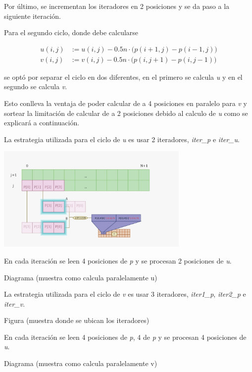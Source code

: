 Por último, se incrementan los iteradores en 2 posiciones y se da paso a la
siguiente iteración.

Para el segundo ciclo, donde debe calcularse

{
\setlength{\abovedisplayskip}{-5pt}
\setlength{\belowdisplayskip}{-10pt}
\begin{align*}
  u(i,j) &:= u(i,j) - 0.5n\cdot\bigl(p(i+1,j)-p(i-1,j)\bigr)\\
  v(i,j) &:= v(i,j) - 0.5n\cdot\bigl(p(i,j+1)-p(i,j-1)\bigr)
\end{align*}
}

se optó por separar el ciclo en dos diferentes, en el primero se calcula
{\it u\/} y en el segundo se calcula {\it v\/}.

Esto conlleva la ventaja de poder calcular de a 4 posiciones en paralelo para
{\it v\/} y sortear la limitación de calcular de a 2 posiciones debido al
calculo de {\it u\/} como se explicará a continuación.

La estrategia utilizada para el ciclo de {\it u\/} es usar 2 iteradores, {\it
  iter_p\/} e {\it iter_u\/}.


\begin{center}
\includegraphics[width=0.7\textwidth]{imagenes/u.jpeg}
\end{center}

En cada iteración se leen 4 posiciones de {\it p\/} y se procesan 2 posiciones
de {\it u\/}.

Diagrama (muestra como calcula paralelamente u)

La estrategia utilizada para el ciclo de {\it v\/} es usar 3 iteradores, {\it
  iter1_p\/}, {\it iter2_p\/} e {\it iter_v}.


Figura (muestra donde se ubican los iteradores)

En cada iteración se leen 4 posiciones de {\it p\/}, 4 de {\it p\/} y se
procesan 4 posiciones de {\it u\/}.

Diagrama (muestra como calcula paralelamente v)
